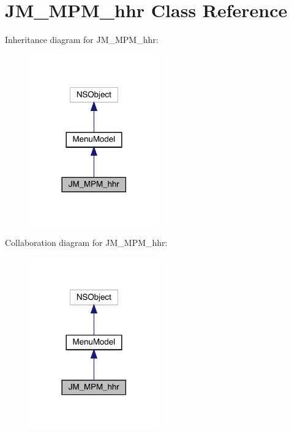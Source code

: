 \hypertarget{interface_j_m___m_p_m__hhr}{}\section{J\+M\+\_\+\+M\+P\+M\+\_\+hhr Class Reference}
\label{interface_j_m___m_p_m__hhr}


Inheritance diagram for J\+M\+\_\+\+M\+P\+M\+\_\+hhr\+:\nopagebreak
\begin{figure}[H]
\begin{center}
\leavevmode
\includegraphics[width=158pt]{interface_j_m___m_p_m__hhr__inherit__graph}
\end{center}
\end{figure}


Collaboration diagram for J\+M\+\_\+\+M\+P\+M\+\_\+hhr\+:\nopagebreak
\begin{figure}[H]
\begin{center}
\leavevmode
\includegraphics[width=158pt]{interface_j_m___m_p_m__hhr__coll__graph}
\end{center}
\end{figure}

